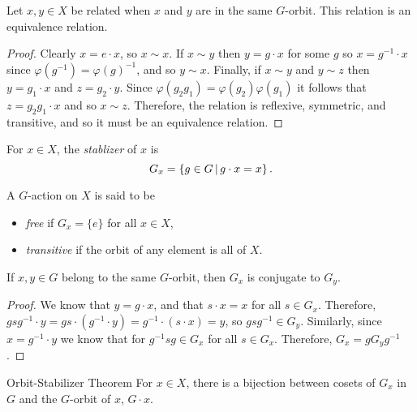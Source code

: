 \begin{prop}
    Let $x, y \in X$ be related when $x$ and $y$ are in the same $G$-orbit. This relation is an equivalence relation.
\end{prop}

\begin{proof}
    Clearly $x = e \cdot x$, so $x \sim x$. If $x \sim y$ then $y = g \cdot x$ for some $g$ so $x = g^{-1} \cdot x$ since $\varphi(g^{-1}) = \varphi(g)^{-1}$, and so $y \sim x$. Finally, if $x \sim y$ and $y \sim z$ then $y = g_1 \cdot x$ and $z = g_2 \cdot y$. Since $\varphi(g_2g_1) = \varphi(g_2)\varphi(g_1)$ it follows that $z = g_2g_1 \cdot x$ and so $x \sim z$. Therefore, the relation is reflexive, symmetric, and transitive, and so it must be an equivalence relation.
\end{proof}

\begin{defn}
    For $x \in X$, the \emph{stablizer} of $x$ is
    \[G_x = \left\{g \in G \,\middle|\, g \cdot x = x\right\}.\]
\end{defn}

\begin{defn}
    A $G$-action on $X$ is said to be
    \begin{itemize}
        \item \emph{free} if $G_x = \{e\}$ for all $x \in X$,
        \item \emph{transitive} if the orbit of any element is all of $X$.
    \end{itemize}
\end{defn}

\begin{thm}
    If $x, y \in G$ belong to the same $G$-orbit, then $G_x$ is conjugate to $G_y$.
\end{thm}

\begin{proof}
    We know that $y = g \cdot x$, and that $s \cdot x = x$ for all $s \in G_x$. Therefore, $gsg^{-1} \cdot y = gs \cdot (g^{-1} \cdot y) = g^{-1} \cdot (s \cdot x) = y$, so $gsg^{-1} \in G_y$. Similarly, since $x = g^{-1} \cdot y$ we know that for $g^{-1}sg \in G_x$ for all $s \in G_x$. Therefore, $G_x = gG_yg^{-1}$.
\end{proof}

\begin{thm}Orbit-Stabilizer Theorem\label{orbit-stablizer}\proofbreak
    For $x \in X$, there is a bijection between cosets of $G_x$ in $G$ and the $G$-orbit of $x$, $G \cdot x$.
\end{thm}

